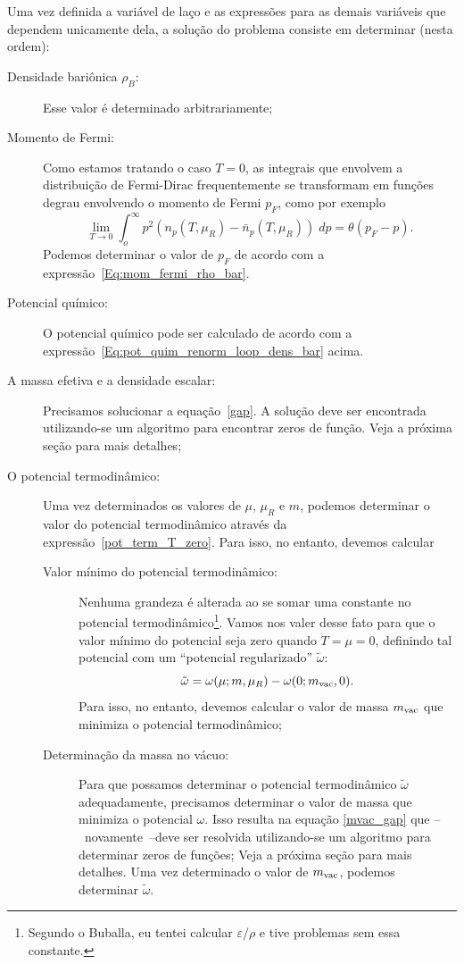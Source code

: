 Uma vez definida a variável de laço e as expressões para as demais variáveis que dependem unicamente dela, a solução do problema consiste em determinar (nesta ordem):
\begin{description}
	\item[Densidade bariônica $\rho_B$:] Esse valor é determinado arbitrariamente;
	\item[Momento de Fermi:] Como estamos tratando o caso $T = 0$, as integrais que envolvem a distribuição de Fermi-Dirac frequentemente se transformam em funções degrau envolvendo o momento de Fermi $p_F$, como por exemplo
		\begin{equation}
			\lim_{T \to 0} \int_o^\infty p^2 (n_p(T, \mu_R) - \bar{n}_p(T, \mu_R)) \;dp = \theta(p_F - p).
		\end{equation}
		Podemos determinar o valor de $p_F$ de acordo com a expressão~\eqref{Eq:mom_fermi_rho_bar}.
	\item[Potencial químico:] O potencial químico pode ser calculado de acordo com a expressão~\eqref{Eq:pot_quim_renorm_loop_dens_bar} acima.
	\item[A massa efetiva e a densidade escalar:] Precisamos solucionar a equação~\eqref{gap}. A solução deve ser encontrada utilizando-se um algoritmo para encontrar zeros de função. Veja a próxima seção para mais detalhes;
	\item[O potencial termodinâmico:] Uma vez determinados os valores de $\mu$, $\mu_R$ e $m$, podemos determinar o valor do potencial termodinâmico através da expressão~\eqref{pot_term_T_zero}. Para isso, no entanto, devemos calcular
		\begin{description}
			\item[Valor mínimo do potencial termodinâmico:] Nenhuma grandeza é alterada ao se somar uma constante no potencial termodinâmico\footnote{Segundo o Buballa, eu tentei calcular $\varepsilon/\rho$ e tive problemas sem essa constante.}. Vamos nos valer desse fato para que o valor mínimo do potencial seja zero quando $T = \mu = 0$, definindo tal potencial com um ``potencial regularizado'' $\tilde\omega$:
							\begin{equation}
					\tilde\omega = \omega(\mu;m,\mu_R) - \omega(0;m_{\rm{vac}},0).
				\end{equation}
				Para isso, no entanto, devemos calcular o valor de massa $m_{\rm{vac}}$ que minimiza o potencial termodinâmico;
			\item[Determinação da massa no vácuo:] Para que possamos determinar o potencial termodinâmico $\tilde\omega$ adequadamente, precisamos determinar o valor de massa que minimiza o potencial $\omega$. Isso resulta na equação \ref{mvac_gap} que --~novamente~--deve ser resolvida utilizando-se um algoritmo para determinar zeros de funções; Veja a próxima seção para mais detalhes. Uma vez determinado o valor de $m_{\rm{vac}}$, podemos determinar $\tilde\omega$.

\end{description}
\end{description}
